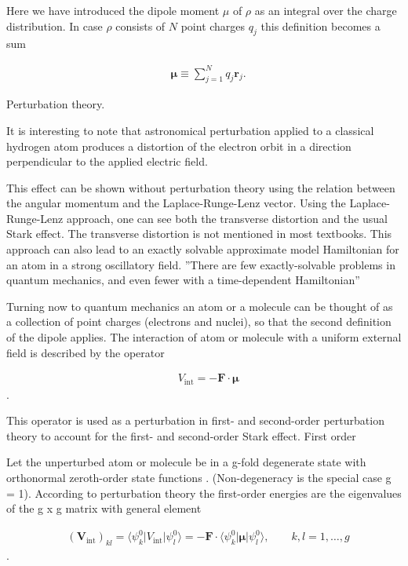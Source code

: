 Here we have introduced the dipole moment $\mu$ of $\rho$ as an integral over the charge distribution. In case $\rho$ consists of $N$ point charges $q_j$ this definition becomes a sum

\begin{align*}
&\boldsymbol{\mu} \equiv \sum_{j=1}^N q_j \mathbf{r}_j.
\end{align*}

Perturbation theory.

It is interesting to note that astronomical perturbation applied to a classical hydrogen atom produces a distortion of the electron orbit in a direction perpendicular to the applied electric field.

This effect can be shown without perturbation theory using the relation between the angular momentum and the Laplace-Runge-Lenz vector. Using the Laplace-Runge-Lenz approach, one can see both the transverse distortion and the usual Stark effect. The transverse distortion is not mentioned in most textbooks. This approach can also lead to an exactly solvable approximate model Hamiltonian for an atom in a strong oscillatory field. ''There are few exactly-solvable problems in quantum mechanics, and even fewer with a time-dependent Hamiltonian''

Turning now to quantum mechanics an atom or a molecule can be thought of as a collection of point charges (electrons and nuclei), so that the second definition of the dipole applies. The interaction of atom or molecule with a uniform external field is described by the operator

\begin{align*}
&    V_{\mathrm{int}} = - \mathbf{F}\cdot \boldsymbol{\mu}
\end{align*}.

This operator is used as a perturbation in first- and second-order perturbation theory to account for the first- and second-order Stark effect.
First order

Let the unperturbed atom or molecule be in a g-fold degenerate state with orthonormal zeroth-order state functions  . (Non-degeneracy is the special case g = 1). According to perturbation theory the first-order energies are the eigenvalues of the g x g matrix with general element

\begin{align*}
&(\mathbf{V}_{\mathrm{int}})_{kl} = \langle \psi^0_k | V_{\mathrm{int}} | \psi^0_l \rangle = -\mathbf{F}\cdot \langle \psi^0_k | \boldsymbol{\mu} | \psi^0_l \rangle, \qquad k,l=1,\ldots, g
\end{align*}
. 

